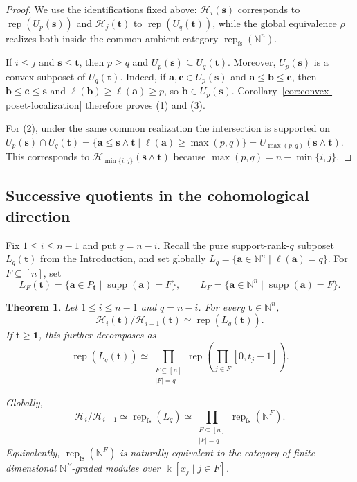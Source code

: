 \documentclass[12pt,reqno]{amsart}
\newtheorem{theorem}{Theorem}[section]
\theoremstyle{definition}
\theoremstyle{remark}
\newcommand{\Rep}{\operatorname{rep}}
\begin{document}
\begin{proof}
We use the identifications fixed above: $\mathcal H_i(\mathbf s)$ corresponds
to $\Rep(U_p(\mathbf s))$ and $\mathcal H_j(\mathbf t)$ to
$\Rep(U_q(\mathbf t))$, while the global equivalence $\rho$ realizes both
inside the common ambient category $\Rep_{\mathrm{fs}}(\mathbb N^n)$.

If $i\le j$ and $\mathbf s\le\mathbf t$, then $p\ge q$ and
$U_p(\mathbf s)\subseteq U_q(\mathbf t)$.  Moreover,
$U_p(\mathbf s)$ is a convex subposet of $U_q(\mathbf t)$.  Indeed, if
$\mathbf a,\mathbf c\in U_p(\mathbf s)$ and
$\mathbf a\le\mathbf b\le\mathbf c$, then
$\mathbf b\le\mathbf c\le\mathbf s$ and
$\ell(\mathbf b)\ge\ell(\mathbf a)\ge p$, so
$\mathbf b\in U_p(\mathbf s)$.  Corollary~\ref{cor:convex-poset-localization}
therefore proves (1) and (3).

For (2), under the same common realization the intersection is supported on
$U_p(\mathbf s)\cap U_q(\mathbf t)
=\{\mathbf a\le\mathbf s\wedge\mathbf t\mid
\ell(\mathbf a)\ge\max(p,q)\}
=U_{\max(p,q)}(\mathbf s\wedge\mathbf t)$.  This corresponds to
$\mathcal H_{\min\{i,j\}}(\mathbf s\wedge\mathbf t)$ because
$\max(p,q)=n-\min\{i,j\}$.
\end{proof}

\subsection{Successive quotients in the cohomological direction}

Fix $1\le i\le n-1$ and put $q=n-i$.  Recall the pure support-rank-$q$ subposet
$L_q(\mathbf t)$ from the Introduction, and set globally $L_q=\{\mathbf a\in\mathbb N^n\mid\ell(\mathbf a)=q\}.$
For $F\subseteq[n]$, set
\[
L_F(\mathbf t)=\{\mathbf a\in P_{\mathbf t}\mid
\operatorname{supp}(\mathbf a)=F\},
\qquad
L_F=\{\mathbf a\in\mathbb N^n\mid\operatorname{supp}(\mathbf a)=F\}.
\]


\begin{theorem}\label{thm:successive-quotient}
Let $1\le i\le n-1$ and $q=n-i$.  For every $\mathbf t\in\mathbb N^n$,
\[
\mathcal H_i(\mathbf t)/\mathcal H_{i-1}(\mathbf t)
\simeq
\Rep(L_q(\mathbf t)).
\]
If $\mathbf t\ge\mathbf1$, this further decomposes as
\[
\Rep(L_q(\mathbf t))
\simeq
\prod_{\substack{F\subseteq[n]\\ |F|=q}}
\Rep\left(\prod_{j\in F}[0,t_j-1]\right).
\]

Globally,
\[
\mathcal H_i/\mathcal H_{i-1}
\simeq
\Rep_{\mathrm{fs}}(L_q)
\simeq
\prod_{\substack{F\subseteq[n]\\|F|=q}}
\Rep_{\mathrm{fs}}(\mathbb N^F).
\]Equivalently, $\Rep_{\mathrm{fs}}(\mathbb N^F)$ is naturally equivalent to
the category of finite-dimensional $\mathbb N^F$-graded modules over
$\Bbbk[x_j\mid j\in F]$.
\end{theorem}
\end{document}
